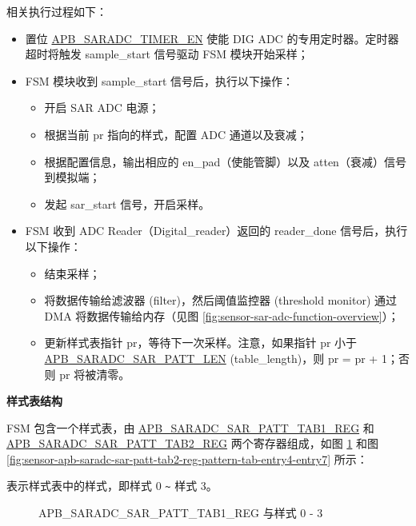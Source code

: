 \documentclass[main\_\_CN.tex]{subfiles}
\begin{document}
相关执行过程如下：
\begin{itemize}
\item 置位 \hyperref[fielddesc:APBSARADCTIMEREN]{APB\_SARADC\_TIMER\_EN} 使能 DIG ADC 的专用定时器。定时器超时将触发 sample\_start 信号驱动 FSM 模块开始采样；
\item FSM 模块收到 sample\_start 信号后，执行以下操作：
\begin{itemize}
    \item 开启 SAR ADC 电源；
    \item 根据当前 pr 指向的样式，配置 ADC 通道以及衰减；
    \item 根据配置信息，输出相应的 en\_pad（使能管脚）以及 atten（衰减）信号到模拟端；
    \item 发起 sar\_start 信号，开启采样。
\end{itemize}

    \item FSM 收到 ADC Reader（Digital\_reader）返回的 reader\_done 信号后，执行以下操作：
    \begin{itemize}
        \item 结束采样；
        \item 将数据传输给滤波器 (filter)，然后阈值监控器 (threshold monitor) 通过 DMA 将数据传输给内存（见图 \ref{fig:sensor-sar-adc-function-overview}）；
        \item 更新样式表指针 pr，等待下一次采样。注意，如果指针 pr 小于 \hyperref[fielddesc:APBSARADCSARPATTLEN]{APB\_SARADC\_SAR\_PATT\_LEN} (table\_length)，则 pr = pr + 1；否则 pr 将被清零。
    \end{itemize}
\end{itemize}    


\textbf{样式表结构}

FSM 包含一个样式表，由 \hyperref[regdesc:APBSARADCSARPATTTAB1REG]{APB\_SARADC\_SAR\_PATT\_TAB1\_REG} 和 \hyperref[regdesc:APBSARADCSARPATTTAB1REG]{APB\_SARADC\_SAR\_PATT\_TAB2\_REG} 两个寄存器组成，如图 \ref{fig:sensor-apb-saradc-sar-patt-tab1-reg-pattern-tab-entry0-entry3} 和图 \ref{fig:sensor-apb-saradc-sar-patt-tab2-reg-pattern-tab-entry4-entry7} 所示：

%
%
%
%
%
\begin{regdesc}\begin{reglist}
\item [cmd \regindex{x}] 表示样式表中的样式，即样式 0 \verb+~+ 样式 3。
\end{reglist}\end{regdesc}
\vspace{-2em}
\begin{figure}[H]
    \centering
    \caption{APB\_SARADC\_SAR\_PATT\_TAB1\_REG 与样式 0 - 3}
    \label{fig:sensor-apb-saradc-sar-patt-tab1-reg-pattern-tab-entry0-entry3}
\end{figure}
\end{document}

